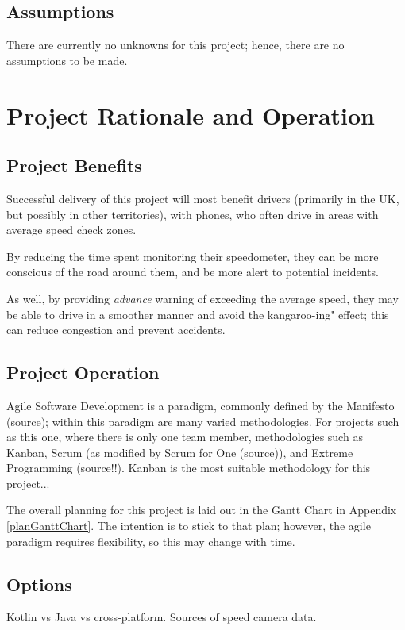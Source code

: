 \documentclass[11pt, a4paper, notitlepage]{report}
\begin{document}
\section{Assumptions}
There are currently no unknowns for this project; hence, there are no 
assumptions to be made.

\chapter{Project Rationale and Operation}
\section{Project Benefits}
Successful delivery of this project will most benefit drivers (primarily in the 
UK, but possibly in other territories), with phones, who often drive in areas 
with average speed check zones. 

By reducing the time spent monitoring their speedometer, they can be more 
conscious of the road around them, and be more alert to potential incidents.

As well, by providing \textit{advance} warning of exceeding the average speed, 
they may be able to drive in a smoother manner and avoid the kangaroo-ing" 
effect; this can reduce congestion and prevent accidents.
\section{Project Operation}\label{projectOperation}
Agile Software Development is a paradigm, commonly defined by the Manifesto 
(source); within this paradigm are many varied methodologies. For projects such 
as this one, where there is only one team member, methodologies such as Kanban, 
Scrum (as modified by Scrum for One (source)), and Extreme Programming 
(source!!).
Kanban is the most suitable methodology for this project...%

The overall planning for this project is laid out in the Gantt Chart in 
Appendix \ref{planGanttChart}. The intention is to stick to that plan; however, 
the agile paradigm requires flexibility, so this may change with time.
\section{Options}
Kotlin vs Java vs cross-platform. Sources of speed camera data. 
\end{document}
